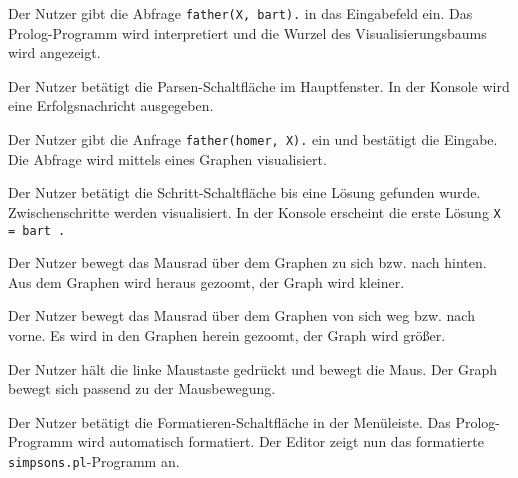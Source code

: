 \documentclass[parskip=full,11pt,twoside]{scrartcl}
\begin{document}
{Der Nutzer gibt die Abfrage \texttt{father(X, bart).} in das Eingabefeld ein.}
{Das Prolog-Programm wird interpretiert und die Wurzel des Visualisierungsbaums wird angezeigt.}


{Der Nutzer betätigt die Parsen-Schaltfläche im Hauptfenster.}
{In der Konsole wird eine Erfolgsnachricht ausgegeben.}

{Der Nutzer gibt die Anfrage \texttt{father(homer, X).} ein und bestätigt die Eingabe.}
{Die Abfrage wird mittels eines Graphen visualisiert.}

{Der Nutzer betätigt die Schritt-Schaltfläche bis eine Lösung gefunden wurde.}
{Zwischenschritte werden visualisiert. In der Konsole erscheint die erste Lösung \texttt{X = bart .}}


{Der Nutzer bewegt das Mausrad über dem Graphen zu sich bzw. nach hinten.}
{Aus dem Graphen wird heraus gezoomt, der Graph wird kleiner.}

{Der Nutzer bewegt das Mausrad über dem Graphen von sich weg bzw. nach vorne.}
{Es wird in den Graphen herein gezoomt, der Graph wird größer.}


{Der Nutzer hält die linke Maustaste gedrückt und bewegt die Maus.}
{Der Graph bewegt sich passend zu der Mausbewegung.}


{Der Nutzer betätigt die Formatieren-Schaltfläche in der Menüleiste.}
{Das Prolog-Programm wird automatisch formatiert. Der Editor zeigt nun das formatierte \texttt{simpsons.pl}-Programm an.}
\end{document}
